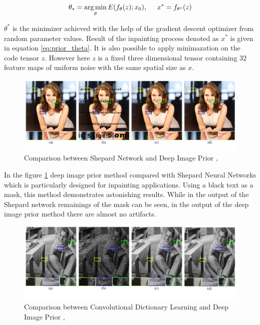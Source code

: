 \begin{equation}
    \theta_{\ast} = \operatorname*{arg\,min}_{\theta}E(f_{\theta}(z);x_{0}) , \hspace{5mm} x^{\ast} = f_{\theta^{\ast}}(z)
    \label{eq:prior_theta}
\end{equation}

\(\theta^{\ast}\) is the minimizer achieved with the help of the gradient descent optimizer from random parameter values. Result of the inpainting process denoted as \(x^{\ast}\) is given in equation \ref{eq:prior_theta}. It is also possible to apply minimazation on the code tensor \(z\). However here \(z\) is a fixed three dimensional tensor containing 32 feature maps of uniform noise with the same spatial size as \(x\).

\begin{figure}[h]
    \centering
    \includegraphics[width=13cm]{figures/chapter4/imprior1.png}
    \caption{Comparison between Shepard Network and Deep Image Prior \cite{shepard_nn}, \cite{deep_image_prior}}
    \label{fig:prior_shepard_comparison}
\end{figure}

In the figure \ref{fig:prior_shepard_comparison} deep image prior method compared with Shepard Neural Networks \cite{shepard_nn} which is particularly designed for inpainting applications. Using a black text as a mask, this method demonstrates astonishing results. While in the output of the Shepard network remainings of the mask can be seen, in the output of the deep image prior method there are almost no artifacts.

\begin{figure}[h]
    \centering
    \includegraphics[width=13cm]{figures/chapter4/imprior2.png}
    \caption{Comparison between Convolutional Dictionary Learning and Deep Image Prior \cite{conv_dict_learning}, \cite{deep_image_prior}}
    \label{fig:prior_dict_camparison}
\end{figure}

